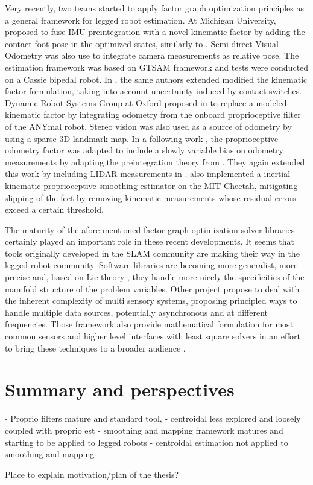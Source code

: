 Very recently, two teams started to apply factor graph optimization principles as a general framework for legged robot estimation. At Michigan University, \cite{hartley2018legged} 
proposed to fuse IMU preintegration with a novel kinematic factor by adding the contact foot pose in the optimized states, similarly to \cite{bloesch2013state,rotella2014state}. 
Semi-direct Visual Odometry \cite{forster2014svo} was also use to integrate camera measurements as relative pose. The estimation framework was based on GTSAM framework \cite{dellaert2012factor}
and tests were conducted on a Cassie bipedal robot. In \cite{hartley2018hybrid}, the same authors extended 
modified the kinematic factor formulation, taking into account uncertainty induced by contact switches. Dynamic Robot Systems Group at Oxford proposed in 
\cite{wisth2019robust} to replace a modeled kinematic factor by integrating odometry from the onboard proprioceptive filter of the ANYmal robot. Stereo vision was also used as a source of
odometry by using a sparse 3D landmark map. In a following work \cite{wisth2020preintegrated}, the proprioceptive odometry factor was adapted
to include a slowly variable bias on odometry measurements by adapting the preintegration theory from \cite{forster2017-TRO}. They again extended this work
by including LIDAR measurements in \cite{wisth2021vilens}.
\cite{kim2021legged} also implemented a inertial kinematic proprioceptive smoothing estimator on the MIT Cheetah, mitigating slipping of the feet by removing kinematic measurements whose residual errors exceed a certain threshold.    


The maturity of the afore mentioned factor graph optimization solver libraries certainly played an important role in these recent developments. It seems
that tools originally developed in the SLAM community are making their way in the legged robot community. Software libraries are becoming more
generalist, more precise and, based on Lie theory \cite{sola2018micro}, they handle more nicely the specificities of the manifold structure of the problem variables.
Other project propose to deal with the inherent complexity of multi sensory systems, proposing principled ways to handle multiple data sources, potentially asynchronous and at
different frequencies. Those framework also provide mathematical formulation for most common sensors and higher level interfaces with least square solvers 
in an effort to bring these techniques to a broader audience \cite{sola2021wolf, blanco2019modular, colosi2020plug}.



\section{Summary and perspectives}
- Proprio filters mature and standard tool, 
- centroidal less explored and loosely coupled with proprio est
- smoothing and mapping framework matures and starting to be applied to legged robots
- centroidal estimation not applied to smoothing and mapping

Place to explain motivation/plan of the thesis?
